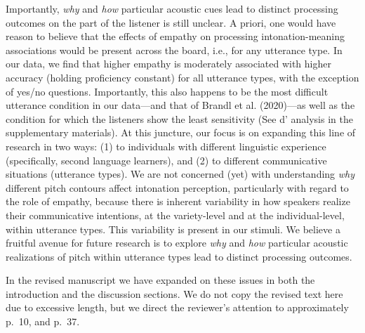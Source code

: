 \documentclass[]{article}
\newcommand{\TaskEstimationBox}[2]{%
\ifoptiondraft{\parbox{1.0\linewidth}{\hfill \hfill {\colorbox{#2}{\color{White} \textbf{#1}}}}}%
{}%
}
\def\Done {\TaskEstimationBox{Done}{Blue}}
\def\Easy {\TaskEstimationBox{Feasible}{ForestGreen}}
\begin{document}
Importantly, \emph{why} and \emph{how} particular acoustic cues lead to distinct processing outcomes on the part of the listener is still unclear.
A priori, one would have reason to believe that the effects of empathy on processing intonation-meaning associations would be present across the board, i.e., for any utterance type.
In our data, we find that higher empathy is moderately associated with higher accuracy (holding proficiency constant) for all utterance types, with the exception of yes/no questions.
Importantly, this also happens to be the most difficult utterance condition in our data---and that of Brandl et al. (2020)---as well as the condition for which the listeners show the least sensitivity (See d' analysis in the supplementary materials).
At this juncture, our focus is on expanding this line of research in two ways: (1) to individuals with different linguistic experience (specifically, second language learners), and (2) to different communicative situations (utterance types).
We are not concerned (yet) with understanding \emph{why} different pitch contours affect intonation perception, particularly with regard to the role of empathy, because there is inherent variability in how speakers realize their communicative intentions, at the variety-level and at the individual-level, within utterance types.
This variability is present in our stimuli.
We believe a fruitful avenue for future research is to explore \emph{why} and \emph{how} particular acoustic realizations of pitch within utterance types lead to distinct processing outcomes.

In the revised manuscript we have expanded on these issues in both the introduction and the discussion sections.
We do not copy the revised text here due to excessive length, but we direct the reviewer's attention to approximately p.~10, and p.~37.

\Done
\Easy

\end{document}
